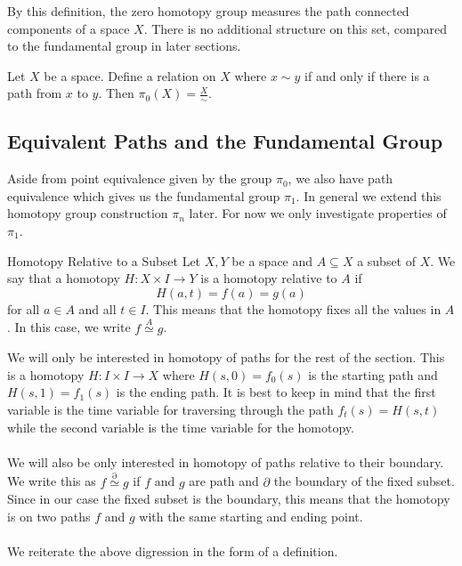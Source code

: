 \documentclass[a4paper]{article}
\begin{document}
By this definition, the zero homotopy group measures the path connected components of a space $X$. There is no additional structure on this set, compared to the fundamental group in later sections. 

\begin{prp}{}{} Let $X$ be a space. Define a relation on $X$ where $x\sim y$ if and only if there is a path from $x$ to $y$. Then $\pi_0(X)=\frac{X}{\sim}$. 
\end{prp}

\subsection{Equivalent Paths and the Fundamental Group}
Aside from point equivalence given by the group $\pi_0$, we also have path equivalence which gives us the fundamental group $\pi_1$. In general we extend this homotopy group construction $\pi_n$ later. For now we only investigate properties of $\pi_1$. 

\begin{defn}{Homotopy Relative to a Subset}{} Let $X,Y$ be a space and $A\subseteq X$ a subset of $X$. We say that a homotopy $H:X\times I\to Y$ is a homotopy relative to $A$ if $$H(a,t)=f(a)=g(a)$$ for all $a\in A$ and all $t\in I$. This means that the homotopy fixes all the values in $A$. In this case, we write $f\overset{A}{\simeq}g$. 
\end{defn}

We will only be interested in homotopy of paths for the rest of the section. This is a homotopy $H:I\times I\to X$ where $H(s,0)=f_0(s)$ is the starting path and $H(s,1)=f_1(s)$ is the ending path. It is best to keep in mind that the first variable is the time variable for traversing through the path $f_t(s)=H(s,t)$ while the second variable is the time variable for the homotopy. \\~\\

We will also be only interested in homotopy of paths relative to their boundary. We write this as $f\overset{\partial}{\simeq}g$ if $f$ and $g$ are path and $\partial$ the boundary of the fixed subset. Since in our case the fixed subset is the boundary, this means that the homotopy is on two paths $f$ and $g$ with the same starting and ending point. \\~\\

We reiterate the above digression in the form of a definition. 
\end{document}
